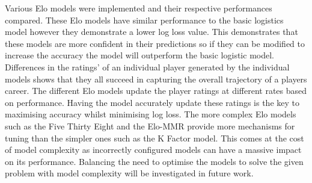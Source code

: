 \documentclass[12pt,a4paper]{article}
\begin{document}
Various Elo models were implemented and their respective performances compared. These Elo
models have similar performance to the basic logistics model however they demonstrate a
lower log loss value. This demonstrates that these models are more confident in their
predictions so if they can be modified to increase the accuracy the model will outperform
the basic logistic model. Differences in the ratings' of an individual player
generated by the individual models shows that they all succeed in capturing the overall
trajectory of a players career. The different Elo models update the player ratings at
different rates based on performance. Having the model accurately update these ratings
is the key to maximising accuracy whilst minimising log loss. The more complex Elo models
such as the Five Thirty Eight and the Elo-MMR provide more mechanisms for tuning than the
simpler ones such as the K Factor model. This comes at the cost of model complexity as
incorrectly configured models can have a massive impact on its performance. Balancing
the need to optimise the models to solve the given problem with model complexity will
be investigated in future work.

\clearpage




\vspace{10mm}
\noindent \hrulefill
\end{document}
